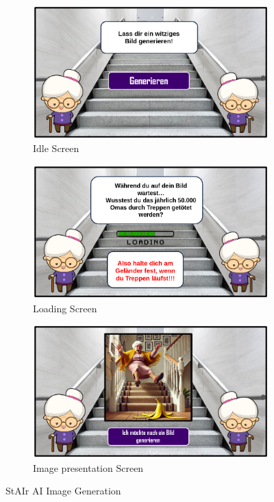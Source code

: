 \documentclass{article}
\begin{document}
\begin{figure}[H]
    \centering
    \begin{subfigure}[H]{0.8\textwidth}
        \centering
        \includegraphics[width=\textwidth]{./resources/StairImgAI_1.png}
        \caption{Idle Screen}
    \end{subfigure}
    \hfill
    \begin{subfigure}[H]{0.8\textwidth}
        \vspace{3mm}
        \centering
        \includegraphics[width=\textwidth]{./resources/StairImgAI_2.png}
        \caption{Loading Screen}
    \end{subfigure}
    \hfill
    \begin{subfigure}[H]{0.8\textwidth}
        \vspace{3mm}
        \centering
        \includegraphics[width=\textwidth]{./resources/StairImgAI_3.png}
        \caption{Image presentation Screen}
    \end{subfigure}
    \caption{StAIr AI Image Generation}
    \label{fig:StairImgAI}
\end{figure}
\end{document}
